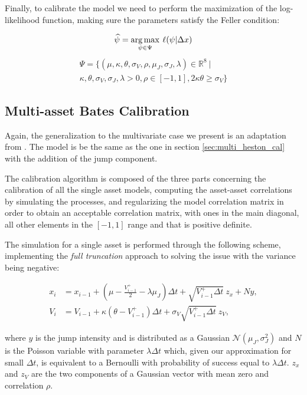 Finally, to calibrate the model we need to perform the maximization of the log-likelihood function, making sure the parameters satisfy the Feller condition:

\begin{equation}
\widehat{\psi} = \operatorname*{arg\,max}_{\psi \in \Psi} \:\ell(\psi |  \Delta x)
\end{equation}
\begin{multline}
\Psi = \{ (\mu, \kappa, \theta, \sigma_V, \rho, \mu_J, \sigma_J, \lambda) \in \mathbb{R}^8 \: |\: \\
\kappa,\theta,\sigma_V,\sigma_J, \lambda >0, \rho \in [-1,1], 2\kappa\theta \geq \sigma_V \}
\end{multline}

\subsection{Multi-asset Bates Calibration}
Again, the generalization to the multivariate case we present is an adaptation from \cite{PARSIMONIOUS2011}. The model is be the same as the one in section \ref{sec:multi_heston_cal} with the addition of the jump component.

The calibration algorithm is composed of the three parts concerning the calibration of all the single asset models, computing the asset-asset correlations by simulating the processes, and regularizing the model correlation matrix in order to obtain an acceptable correlation matrix, with ones in the main diagonal, all other elements in the $[-1,1]$ range and that is positive definite.

The simulation for a single asset is performed through the following scheme, implementing the \textit{full truncation} approach to solving the issue with the variance being negative:

\begin{subequations}
	\label{eq:bates_sim}
	\begin{align}
	x_i &= x_{i-1} + (\mu -  \frac{V_{i-1}^+}{2}- \lambda \mu_J)\Delta t + \sqrt{V_{i-1}^+ \Delta t} \:z_x + N y, \\
	V_i &= V_{i-1} + \kappa(\theta - V_{i-1}^+ )\Delta t + \sigma_V \sqrt{V_{i-1}^+ \Delta t} \: z_V,
	\end{align}
\end{subequations}

where $y$ is the jump intensity and is distributed as a Gaussian $\mathcal{N}(\mu_J, \sigma_J^2)$ and $N$ is the Poisson variable with parameter $\lambda \Delta t$ which, given our approximation for small $\Delta t$, is equivalent to a Bernoulli with probability of success equal to $\lambda \Delta t$. 
$z_x$ and $z_V$ are the two components of a Gaussian vector with mean zero and correlation $\rho$.

